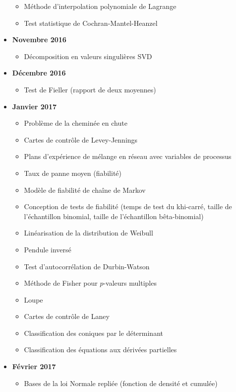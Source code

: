 \documentclass[12pt,a4paper,twoside,openright]{report}
\theoremstyle{definition}
\theoremstyle{itexmp}
\numberwithin{equation}{section}
\begin{document}
\begin{itemize}
\begin{itemize}[noitemsep]
				\item Méthode d'interpolation polynomiale de Lagrange
				\item Test statistique de Cochran-Mantel-Heanzel
			\end{itemize}
		\item \textbf{Novembre 2016}
			\begin{itemize}[noitemsep]
				\item Décomposition en valeurs singulières SVD
			\end{itemize}
		\item \textbf{Décembre 2016}
			\begin{itemize}[noitemsep]
				\item Test de Fieller (rapport de deux moyennes)
			\end{itemize}
		\item \textbf{Janvier 2017}
			\begin{itemize}[noitemsep]
				\item Problème de la cheminée en chute
				\item Cartes de contrôle de Levey-Jennings
				\item Plans d'expérience de mélange en réseau avec variables de processus
				\item Taux de panne moyen (fiabilité)
				\item Modèle de fiabilité de chaîne de Markov
				\item Conception de tests de fiabilité (temps de test du khi-carré, taille de l'échantillon binomial, taille de l'échantillon bêta-binomial)
				\item Linéarisation de la distribution de Weibull
				\item Pendule inversé
				\item Test d'autocorrélation de Durbin-Watson
				\item Méthode de Fisher pour $p$-valeurs multiples
				\item Loupe
				\item Cartes de contrôle de Laney
				\item Classification des coniques par le déterminant	
				\item Classification des équations aux dérivées partielles
			\end{itemize}
		\item \textbf{Février 2017}
			\begin{itemize}[noitemsep]
				\item Bases de la loi Normale repliée (fonction de densité et cumulée)

\end{itemize}
\end{itemize}
\end{document}
